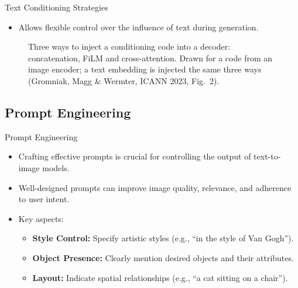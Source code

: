 \begin{frame}[allowframebreaks]{Text Conditioning Strategies}
\begin{itemize}
\begin{itemize}
            \item Allows flexible control over the influence of text during generation.
        \end{itemize}
    \end{itemize}
\framebreak
    \begin{figure}
        \centering
        \caption*{Three ways to inject a conditioning code into a decoder: concatenation, FiLM and cross-attention. Drawn for a code from an image encoder; a text embedding is injected the same three ways (Gromniak, Magg \& Wermter, ICANN 2023, Fig.~2).}
    \end{figure}
\end{frame}

\subsection{Prompt Engineering}
\begin{frame}[allowframebreaks]{Prompt Engineering}
    \begin{itemize}
        \item Crafting effective prompts is crucial for controlling the output of text-to-image models.
        \item Well-designed prompts can improve image quality, relevance, and adherence to user intent.
        \item Key aspects:
        \begin{itemize}
            \item \textbf{Style Control:} Specify artistic styles (e.g., ``in the style of Van Gogh'').
            \item \textbf{Object Presence:} Clearly mention desired objects and their attributes.
            \item \textbf{Layout:} Indicate spatial relationships (e.g., ``a cat sitting on a chair'').
        \end{itemize}
    \end{itemize}
\end{frame}

